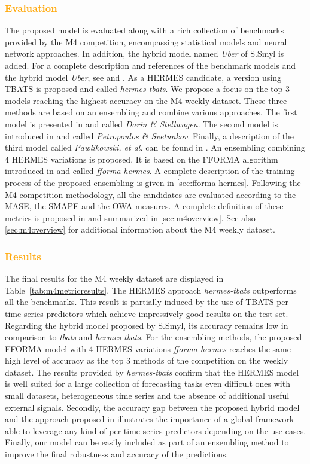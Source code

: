 \documentclass[10pt]{article} %
\begin{document}
\textcolor{orange}{\subsubsection{Evaluation}}
The proposed model is evaluated along with a rich collection of benchmarks provided by the M4 competition, encompassing statistical models and neural network approaches. In addition, the hybrid model named \textit{Uber} of S.Smyl is added. For a complete description and references of the benchmark models and the hybrid model \textit{Uber}, see \citet{makridakis2020} and \citet{smyl2020}. As a HERMES candidate, a version using TBATS is proposed and called \textit{hermes-tbats}. We propose a focus on the top 3 models reaching the highest accuracy on the M4 weekly dataset. These three methods are based on an ensembling and combine various approaches.
The first model is presented in \citet{darin2020} and called \textit{Darin \& Stellwagen}. The second model is introduced in \citet{petropoulos2020} and called \textit{Petropoulos \& Svetunkov}. Finally, a description of the third model  called \textit{Pawlikowski, et al.} can be found in \citet{pawlikowski2020}. An ensembling combining 4 HERMES variations is proposed. It is based on the FFORMA algorithm introduced in \citet{montero2020} and called \textit{fforma-hermes}. A complete description of the training process of the proposed ensembling is given in \ref{sec:fforma-hermes}. Following the M4 competition methodology, all the candidates are evaluated according to the MASE, the SMAPE and the OWA measures. A complete definition of these metrics is proposed in \citet{makridakis2020} and summarized in \ref{sec:m4overview}. See also \ref{sec:m4overview} for additional information about the M4 weekly dataset.

\textcolor{orange}{\subsubsection{Results}}
The final results for the M4 weekly dataset are displayed in Table~\ref{tab:m4metricresults}. The HERMES approach \textit{hermes-tbats} outperforms all the benchmarks. This result is partially induced by the use of TBATS per-time-series predictors which achieve impressively good results on the test set. Regarding the hybrid model proposed by S.Smyl, its accuracy remains low in comparison to \textit{tbats} and  \textit{hermes-tbats}. For the ensembling methods, the proposed FFORMA model with 4 HERMES variations \textit{fforma-hermes} reaches the same high level of accuracy as the top 3 methods of the competition on the weekly dataset.
The results provided by \textit{hermes-tbats} confirm that the HERMES model is well suited for a large collection of forecasting tasks even difficult ones with small datasets, heterogeneous time series and the absence of  additional useful external signals. Secondly, the accuracy gap between the proposed hybrid model and the approach proposed in \citet{smyl2020} illustrates the importance of a global framework able to leverage any kind of per-time-series predictors depending on the use cases. Finally, our model can be easily included as part of an ensembling method to improve the final robustness and accuracy of the predictions.
\end{document}
